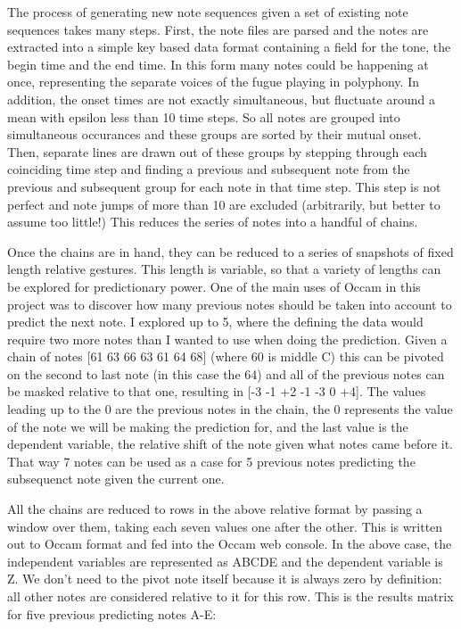 \documentclass[11pt]{article}
\begin{document}
The process of generating new note sequences given a set of existing note sequences takes many steps.  First, the note files are parsed and the notes are extracted into a simple key based data format containing a field for the tone, the begin time and the end time.  In this form many notes could be happening at once, representing the separate voices of the fugue playing in polyphony.  In addition, the onset times are not exactly simultaneous, but fluctuate around a mean with epsilon less than 10 time steps.  So all notes are grouped into simultaneous occurances and these groups are sorted by their mutual onset.  Then, separate lines are drawn out of these groups by stepping through each coinciding time step and finding a previous and subsequent note from the previous and subsequent group for each note in that time step.  This step is not perfect and note jumps of more than 10 are excluded (arbitrarily, but better to assume too little!)  This reduces the series of notes into a handful of chains.  

Once the chains are in hand, they can be reduced to a series of snapshots of fixed length relative gestures.  This length is variable, so that a variety of lengths can be explored for predictionary power.  One of the main uses of Occam in this project was to discover how many previous notes should be taken into account to predict the next note.  I explored up to 5, where the defining the data would require two more notes than I wanted to use when doing the prediction.  Given a chain of notes [61 63 66 63 61 64 68] (where 60 is middle C) this can be pivoted on the second to last note (in this case the 64) and all of the previous notes can be masked relative to that one, resulting in [-3 -1 +2 -1 -3 0 +4].  The values leading up to the 0 are the previous notes in the chain, the 0 represents the value of the note we will be making the prediction for, and the last value is the dependent variable, the relative shift of the note given what notes came before it.  That way 7 notes can be used as a case for 5 previous notes predicting the subsequenct note given the current one.

All the chains are reduced to rows in the above relative format by passing a window over them, taking each seven values one after the other.  This is written out to Occam format and fed into the Occam web console.  In the above case, the independent variables are represented as ABCDE and the dependent variable is Z.  We don't need to the pivot note itself because it is always zero by definition:  all other notes are considered relative to it for this row.  This is the results matrix for five previous predicting notes A-E:
\end{document}
